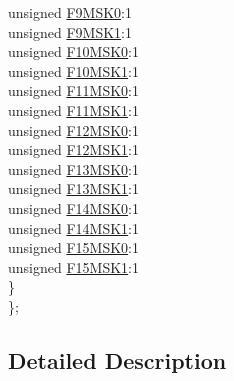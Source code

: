 \begin{DoxyCompactItemize}
\begin{tabbing}
\>\>unsigned \hyperlink{structtag_c2_f_m_s_k_s_e_l2_b_i_t_s_a5369fb75b960056abfeb10f83ae06ca9}{F9MSK0}:1\\
\>\>unsigned \hyperlink{structtag_c2_f_m_s_k_s_e_l2_b_i_t_s_a0a50875460baa60f96ea09203b5aa366}{F9MSK1}:1\\
\>\>unsigned \hyperlink{structtag_c2_f_m_s_k_s_e_l2_b_i_t_s_a21decb0da8dba6ca537b4a8a1f246f29}{F10MSK0}:1\\
\>\>unsigned \hyperlink{structtag_c2_f_m_s_k_s_e_l2_b_i_t_s_a8f775a19c49b8476ab5bc7bd47754bd1}{F10MSK1}:1\\
\>\>unsigned \hyperlink{structtag_c2_f_m_s_k_s_e_l2_b_i_t_s_a3c47803e256bbc465af37fe5e206df71}{F11MSK0}:1\\
\>\>unsigned \hyperlink{structtag_c2_f_m_s_k_s_e_l2_b_i_t_s_adcaad4612ad17713c6b95f74d96e1b21}{F11MSK1}:1\\
\>\>unsigned \hyperlink{structtag_c2_f_m_s_k_s_e_l2_b_i_t_s_a3b4a47b983bc53f75674ca8e6addbdbb}{F12MSK0}:1\\
\>\>unsigned \hyperlink{structtag_c2_f_m_s_k_s_e_l2_b_i_t_s_ab5b1457ace073a91a32895138412d98a}{F12MSK1}:1\\
\>\>unsigned \hyperlink{structtag_c2_f_m_s_k_s_e_l2_b_i_t_s_a20953490bc863dbaeb168c1736963cc5}{F13MSK0}:1\\
\>\>unsigned \hyperlink{structtag_c2_f_m_s_k_s_e_l2_b_i_t_s_a3dc54dff163d977993577589b8b7728a}{F13MSK1}:1\\
\>\>unsigned \hyperlink{structtag_c2_f_m_s_k_s_e_l2_b_i_t_s_a35d58fc54faded9e6c730b096fe2867f}{F14MSK0}:1\\
\>\>unsigned \hyperlink{structtag_c2_f_m_s_k_s_e_l2_b_i_t_s_ab95583cb74fadfdd8b0751a063cd5914}{F14MSK1}:1\\
\>\>unsigned \hyperlink{structtag_c2_f_m_s_k_s_e_l2_b_i_t_s_a68478b714c3054364436086f6da56127}{F15MSK0}:1\\
\>\>unsigned \hyperlink{structtag_c2_f_m_s_k_s_e_l2_b_i_t_s_a9d2b30a0f02718f2156adf828d0e4cbe}{F15MSK1}:1\\
\>\} \\
\}; \\

\end{tabbing}\end{DoxyCompactItemize}


\subsection{Detailed Description}


